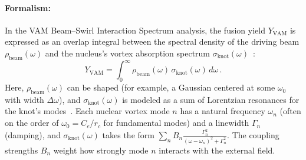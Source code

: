 \documentclass[a4paper,12pt]{article}
\begin{document}
\paragraph{Formalism:} In the VAM Beam--Swirl Interaction Spectrum analysis, the fusion yield $Y_{\text{VAM}}$ is expressed as an overlap integral between the spectral density of the driving beam $\rho_{\text{beam}}(\omega)$ and the nucleus's vortex absorption spectrum $\sigma_{\text{knot}}(\omega)$~\cite{vamcore}:
\begin{equation}
Y_{\text{VAM}} = \int_0^{\infty} \rho_{\text{beam}}(\omega)\,\sigma_{\text{knot}}(\omega)\,d\omega\,.
\label{eq:swirlres}
\end{equation}
Here, $\rho_{\text{beam}}(\omega)$ can be shaped (for example, a Gaussian centered at some $\omega_0$ with width $\Delta\omega$), and $\sigma_{\text{knot}}(\omega)$ is modeled as a sum of Lorentzian resonances for the knot's modes~\cite{vamcore}. Each nuclear vortex mode $n$ has a natural frequency $\omega_n$ (often on the order of $\omega_0 = C_e/r_c$ for fundamental modes) and a linewidth $\Gamma_n$ (damping), and $\sigma_{\text{knot}}(\omega)$ takes the form $\sum_n B_n \frac{\Gamma_n^2}{(\omega-\omega_n)^2+\Gamma_n^2}$. The coupling strengths $B_n$ weight how strongly mode $n$ interacts with the external field.
\end{document}
